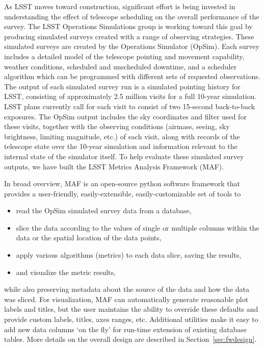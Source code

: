 \documentclass[]{spie}  %
\begin{document}
As LSST moves toward construction, significant effort is being
invested in understanding the effect of telescope scheduling on the
overall performance of the survey. The LSST Operations Simulations
group is working toward this goal by producing simulated
surveys created with a range of observing strategies. These simulated
surveys are created by the Operations Simulator (OpSim)\cite{opsim3,
  opsim2, opsim1}. Each survey includes a detailed model of the
telescope pointing and movement capability, weather conditions,
scheduled and unscheduled downtime, and a scheduler algorithm which
can be programmed with different sets of requested observations. The
output of each simulated survey run is a simulated pointing
history for LSST, consisting of approximately 2.5 million visits for a
full 10-year simulation. LSST
plans currently call for each visit to consist of two 15-second
back-to-back exposures.  The OpSim output includes the sky coordinates
and filter used for these visits, together with the observing conditions (airmass, seeing,
sky brightness, limiting magnitude, etc.) of each visit, along with
records of the telescope state over the 10-year simulation and
information relevant to the internal state of the simulator itself. To
help evaluate these simulated survey outputs, we have built the LSST
Metrics Analysis Framework (MAF).

In broad overview, MAF is an open-source python software framework that
provides a user-friendly, easily-extensible, easily-customizable set of tools to 
\begin{itemize}
\item{read the OpSim simulated survey data from a database,}
\item{slice the data according to the values of single or multiple
columns within the data or the spatial location of the data points,}
\item{apply various algorithms (metrics) to each data slice, saving the results,}
\item{and visualize the metric results,}
\end{itemize}
while also preserving metadata about the source of the data and how the
data was sliced. For visualization, MAF can automatically generate reasonable plot labels and titles, but
the user maintains the ability to override these defaults and provide custom
labels, titles, axes ranges, etc. Additional utilities make it easy to
add new data columns `on the fly' for run-time extension of
existing database tables. More details on the overall design are
described in Section~\ref{sec:fwdesign}. 
\end{document}
